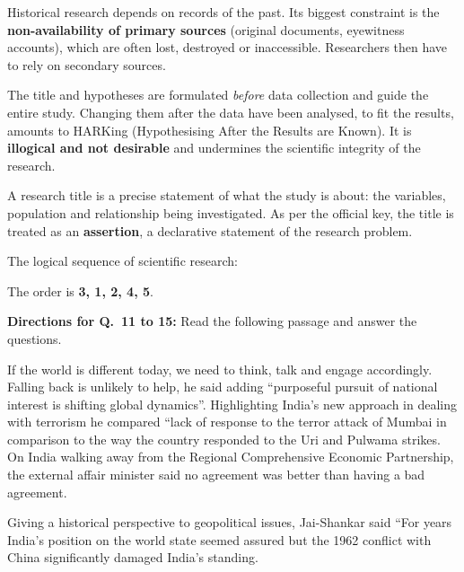 Historical research depends on records of the past. Its biggest constraint is the \textbf{non-availability of primary sources} (original documents, eyewitness accounts), which are often lost, destroyed or inaccessible. Researchers then have to rely on secondary sources.

The title and hypotheses are formulated \emph{before} data collection and guide the entire study. Changing them after the data have been analysed, to fit the results, amounts to HARKing (Hypothesising After the Results are Known). It is \textbf{illogical and not desirable} and undermines the scientific integrity of the research.

A research title is a precise statement of what the study is about: the variables, population and relationship being investigated. As per the official key, the title is treated as an \textbf{assertion}, a declarative statement of the research problem.

The logical sequence of scientific research:
\begin{center}
\end{center}
The order is \textbf{3, 1, 2, 4, 5}.

\textbf{Directions for Q.~11 to 15:} Read the following passage and answer the questions.\par\smallskip
If the world is different today, we need to think, talk and engage accordingly. Falling back is unlikely to help, he said adding ``purposeful pursuit of national interest is shifting global dynamics''. Highlighting India's new approach in dealing with terrorism he compared ``lack of response to the terror attack of Mumbai in comparison to the way the country responded to the Uri and Pulwama strikes. On India walking away from the Regional Comprehensive Economic Partnership, the external affair minister said no agreement was better than having a bad agreement.

Giving a historical perspective to geopolitical issues, Jai-Shankar said ``For years India's position on the world state seemed assured but the 1962 conflict with China significantly damaged India's standing.

